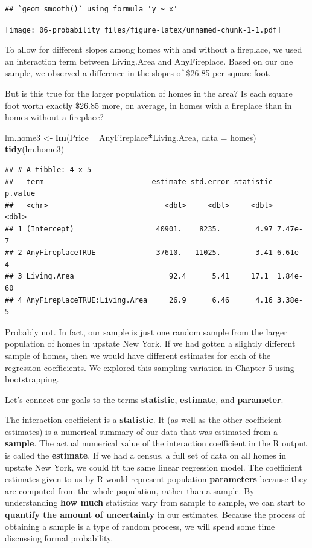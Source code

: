 \documentclass[
]{book}
\newenvironment{Shaded}{\begin{snugshade}}{\end{snugshade}}
\newcommand{\DataTypeTok}[1]{\textcolor[rgb]{0.13,0.29,0.53}{#1}}
\newcommand{\KeywordTok}[1]{\textcolor[rgb]{0.13,0.29,0.53}{\textbf{#1}}}
\newcommand{\NormalTok}[1]{#1}
\newcommand{\OperatorTok}[1]{\textcolor[rgb]{0.81,0.36,0.00}{\textbf{#1}}}
\newcommand{\StringTok}[1]{\textcolor[rgb]{0.31,0.60,0.02}{#1}}
\begin{document}
\begin{verbatim}
## `geom_smooth()` using formula 'y ~ x'
\end{verbatim}

\texttt{[image: 06-probability\_files/figure-latex/unnamed-chunk-1-1.pdf]}

To allow for different slopes among homes with and without a fireplace, we used an interaction term between Living.Area and AnyFireplace. Based on our one sample, we observed a difference in the slopes of \$26.85 per square foot.

But is this true for the larger population of homes in the area? Is each square foot worth exactly \$26.85 more, on average, in homes with a fireplace than in homes without a fireplace?

\begin{Shaded}
\begin{Highlighting}[]
\NormalTok{lm.home3 <-}\StringTok{ }\KeywordTok{lm}\NormalTok{(Price }\OperatorTok{~}\StringTok{ }\NormalTok{AnyFireplace}\OperatorTok{*}\NormalTok{Living.Area, }\DataTypeTok{data =}\NormalTok{ homes)}
\KeywordTok{tidy}\NormalTok{(lm.home3)}
\end{Highlighting}
\end{Shaded}

\begin{verbatim}
## # A tibble: 4 x 5
##   term                         estimate std.error statistic  p.value
##   <chr>                           <dbl>     <dbl>     <dbl>    <dbl>
## 1 (Intercept)                   40901.    8235.        4.97 7.47e- 7
## 2 AnyFireplaceTRUE             -37610.   11025.       -3.41 6.61e- 4
## 3 Living.Area                      92.4      5.41     17.1  1.84e-60
## 4 AnyFireplaceTRUE:Living.Area     26.9      6.46      4.16 3.38e- 5
\end{verbatim}

Probably not. In fact, our sample is just one random sample from the larger population of homes in upstate New York. If we had gotten a slightly different sample of homes, then we would have different estimates for each of the regression coefficients. We explored this sampling variation in \protect\hyperlink{randvariability}{Chapter 5} using bootstrapping.

Let's connect our goals to the terms \textbf{statistic}, \textbf{estimate}, and \textbf{parameter}.

The interaction coefficient is a \textbf{statistic}. It (as well as the other coefficient estimates) is a numerical summary of our data that was estimated from a \textbf{sample}. The actual numerical value of the interaction coefficient in the R output is called the \textbf{estimate}. If we had a census, a full set of data on all homes in upstate New York, we could fit the same linear regression model. The coefficient estimates given to us by R would represent population \textbf{parameters} because they are computed from the whole population, rather than a sample. By understanding \textbf{how much} statistics vary from sample to sample, we can start to \textbf{quantify the amount of uncertainty} in our estimates. Because the process of obtaining a sample is a type of random process, we will spend some time discussing formal probability.
\end{document}

